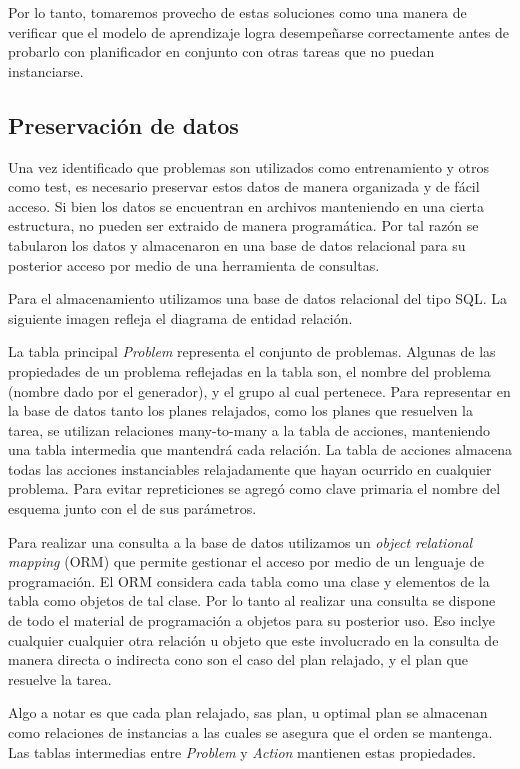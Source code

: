 Por lo tanto, tomaremos provecho de estas soluciones como una manera de verificar que el modelo de aprendizaje logra desempeñarse correctamente antes de probarlo con planificador en conjunto con otras tareas que no puedan instanciarse.

\subsection{Preservación de datos}

Una vez identificado que problemas son utilizados como entrenamiento y otros como test, es necesario preservar estos datos de manera organizada y de fácil acceso. Si bien los datos se encuentran en archivos manteniendo en una cierta estructura, no pueden ser extraido de manera programática. Por tal razón se tabularon los datos y almacenaron en una base de datos relacional para su posterior acceso por medio de una herramienta de consultas.

Para el almacenamiento utilizamos una base de datos relacional del tipo SQL. La siguiente imagen refleja el diagrama de entidad relación.

La tabla principal \emph{Problem} representa el conjunto de problemas. Algunas de las propiedades de un problema reflejadas en la tabla son, el nombre del problema (nombre dado por el generador), y el grupo al cual pertenece. Para representar en la base de datos tanto los planes relajados, como los planes que resuelven la tarea, se utilizan relaciones many-to-many a la tabla de acciones, manteniendo una tabla intermedia que mantendrá cada relación.
La tabla de acciones almacena todas las acciones instanciables relajadamente que hayan ocurrido en cualquier problema. Para evitar repreticiones se agregó como clave primaria el nombre del esquema junto con el de sus parámetros.

Para realizar una consulta a la base de datos utilizamos un \emph{object relational mapping} (ORM) que permite gestionar el acceso por medio de un lenguaje de programación. El ORM considera cada tabla como una clase y elementos de la tabla como objetos de tal clase. Por lo tanto al realizar una consulta se dispone de todo el material de programación a objetos para su posterior uso. Eso inclye cualquier cualquier otra relación u objeto que este involucrado en la consulta de manera directa o indirecta cono son el caso del plan relajado, y el plan que resuelve la tarea.

Algo a notar es que cada plan relajado, sas plan, u optimal plan se almacenan como relaciones de instancias a las cuales se asegura que el orden se mantenga. Las tablas intermedias entre \emph{Problem} y \emph{Action} mantienen estas propiedades.

